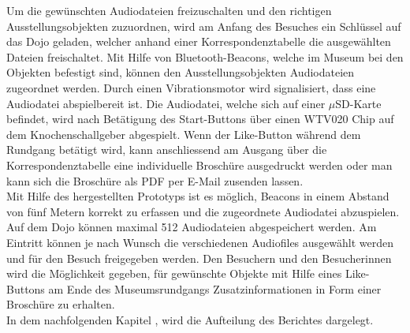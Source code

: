 Um die gewünschten Audiodateien freizuschalten und den richtigen Ausstellungsobjekten zuzuordnen, wird am Anfang des Besuches ein Schlüssel auf das Dojo geladen, welcher anhand einer Korrespondenztabelle die ausgewählten Dateien freischaltet. Mit Hilfe von Bluetooth-Beacons, welche im Museum bei den Objekten befestigt sind, können den Ausstellungsobjekten Audiodateien zugeordnet werden. Durch einen Vibrationsmotor wird signalisiert, dass eine Audiodatei abspielbereit ist. Die Audiodatei, welche sich auf einer $\mu$SD-Karte befindet, wird nach Betätigung des Start-Buttons über einen WTV020 Chip auf dem Knochenschallgeber abgespielt. Wenn der Like-Button während dem Rundgang betätigt wird, kann anschliessend am Ausgang über die Korrespondenztabelle eine individuelle Broschüre ausgedruckt werden oder man kann sich die Broschüre als PDF per E-Mail zusenden lassen.\\

Mit Hilfe des hergestellten Prototyps ist es möglich, Beacons in einem Abstand von fünf Metern korrekt zu erfassen und die zugeordnete Audiodatei abzuspielen. Auf dem Dojo können maximal 512 Audiodateien abgespeichert werden. Am Eintritt können je nach Wunsch die verschiedenen Audiofiles ausgewählt werden und für den Besuch freigegeben werden. Den Besuchern und den Besucherinnen wird die Möglichkeit gegeben, für gewünschte Objekte mit Hilfe eines Like-Buttons am Ende des Museumsrundgangs Zusatzinformationen in Form einer Broschüre zu erhalten.\\
 
In dem nachfolgenden Kapitel , wird die Aufteilung des Berichtes dargelegt. 
